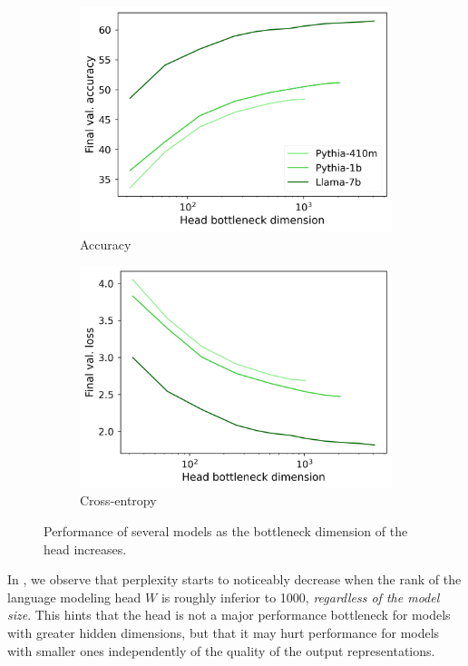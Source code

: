 \begin{figure}[h]
\centering
    \begin{subfigure}{0.41\columnwidth}
         \includegraphics[width=\linewidth]{sources/part_1/softmax_bottleneck/imgs/llama_bottleneck_acc.png}
         \caption{Accuracy}
         \label{fig:bottleneck_acc}
    \end{subfigure}
    \begin{subfigure}{0.42\columnwidth}
         \includegraphics[width=\linewidth]{sources/part_1/softmax_bottleneck/imgs/llama_bottleneck_loss.png}
         \caption{Cross-entropy}
         \label{fig:bottleneck_ce}
    \end{subfigure}
    \caption{Performance of several models as the bottleneck dimension of the head increases.}
    \label{fig:perf_bottleneck}
\end{figure}
In , we observe that perplexity starts to noticeably decrease when the rank of the language modeling head $W$ is roughly inferior to 1000, \textit{regardless of the model size}. This hints that the head is not a major performance bottleneck for models with greater hidden dimensions, but that it may hurt performance for models with smaller ones independently of the quality of the output representations.

